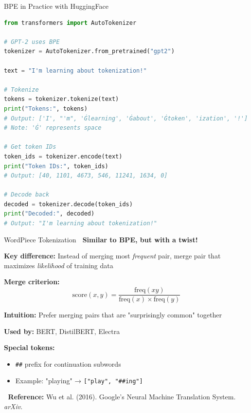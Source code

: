 \documentclass[aspectratio=169]{beamer}
\begin{document}
\begin{frame}[fragile]{BPE in Practice with HuggingFace 🤗}
    \begin{lstlisting}[language=Python]
from transformers import AutoTokenizer

# GPT-2 uses BPE
tokenizer = AutoTokenizer.from_pretrained("gpt2")

text = "I'm learning about tokenization!"

# Tokenize
tokens = tokenizer.tokenize(text)
print("Tokens:", tokens)
# Output: ['I', "'m", 'Ġlearning', 'Ġabout', 'Ġtoken', 'ization', '!']
# Note: 'Ġ' represents space

# Get token IDs
token_ids = tokenizer.encode(text)
print("Token IDs:", token_ids)
# Output: [40, 1101, 4673, 546, 11241, 1634, 0]

# Decode back
decoded = tokenizer.decode(token_ids)
print("Decoded:", decoded)
# Output: "I'm learning about tokenization!"
    \end{lstlisting}
\end{frame}

\begin{frame}{WordPiece Tokenization 🧩}
    \textbf{Similar to BPE, but with a twist!}

    \vspace{0.5em}
    \textbf{Key difference:} Instead of merging most \textit{frequent} pair, merge pair that maximizes \textit{likelihood} of training data

    \vspace{0.5em}
    \textbf{Merge criterion:}
    \[
    \text{score}(x, y) = \frac{\text{freq}(xy)}{\text{freq}(x) \times \text{freq}(y)}
    \]

    \vspace{0.5em}
    \textbf{Intuition:} Prefer merging pairs that are "surprisingly common" together

    \vspace{0.5em}
    \textbf{Used by:} BERT, DistilBERT, Electra

    \vspace{0.5em}
    \textbf{Special tokens:}
    \begin{itemize}\setlength{\itemsep}{0pt}
        \item \texttt{\#\#} prefix for continuation subwords
        \item Example: "playing" → \texttt{["play", "\#\#ing"]}
    \end{itemize}

    \vspace{0.5em}
    📖 \textbf{Reference:} Wu et al. (2016). Google's Neural Machine Translation System. \textit{arXiv}.
\end{frame}
\end{document}
